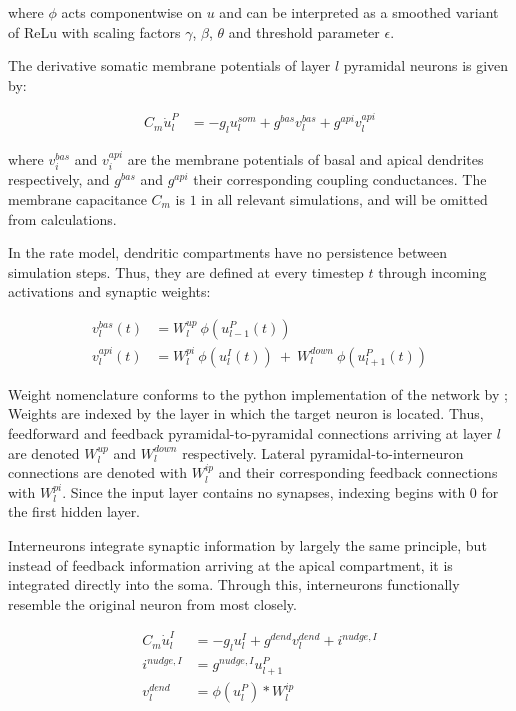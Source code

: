 where $\phi$ acts componentwise on $u$ and can be interpreted as a smoothed variant of ReLu  with scaling factors $\gamma$, $\beta$,
$\theta$ and threshold parameter $\epsilon$.


The derivative somatic membrane potentials of layer $l$ pyramidal neurons is given by:

\begin{align}
  C_m \dot{u}_l^P & = - g_l u_l^{som} + g^{bas} v_l^{bas} + g^{api} v_l^{api}
\end{align}

where $v_i^{bas}$ and $v_i^{api}$ are the membrane potentials of basal and apical dendrites respectively, and $g^{bas}$
and $g^{api}$ their corresponding coupling conductances. The membrane capacitance $C_m$ is $1$ in all relevant simulations,
and will be omitted from calculations.


In the rate model, dendritic compartments have no persistence
between simulation steps. Thus, they are defined at every timestep $t$ through incoming activations and synaptic weights:

\begin{align}
  v_l^{bas}(t) & = W_l^{up} \ \phi(u_{l-1}^P(t))                                     \\
  v_l^{api}(t) & =  W_l^{pi} \ \phi(u_l^I(t)) \ + \  W_l^{down} \ \phi(u_{l+1}^P(t))
\end{align}

Weight nomenclature conforms to the python implementation of the network by \cite{Haider2021}; Weights are indexed by
the layer in which
the target neuron is located. Thus, feedforward and feedback pyramidal-to-pyramidal connections arriving at layer $l$
are denoted $W_l^{up}$ and $W_l^{down}$ respectively. Lateral pyramidal-to-interneuron connections are denoted with $W_l^{ip}$
and their corresponding feedback connections with $W_l^{pi}$. Since the input layer contains no synapses, indexing begins
with $0$ for the first hidden layer. \newline

Interneurons integrate synaptic information by largely the same principle, but
instead of feedback information arriving at the apical compartment, it is integrated directly into the soma. Through
this, interneurons functionally resemble the original neuron from \cite{urbanczik2014learning} most closely.

\begin{align}
  C_m \dot{u}_l^I & = - g_l u_l^{I} + g^{dend} v_l^{dend} + i^{nudge, I}\label{eq-intn-dynamics} \\
  i^{nudge, I}    & = g^{nudge, I} u_{l+1}^P                             \\
  v_l^{dend}      & = \phi(u_{l}^P) * W_l^{ip}
\end{align}

